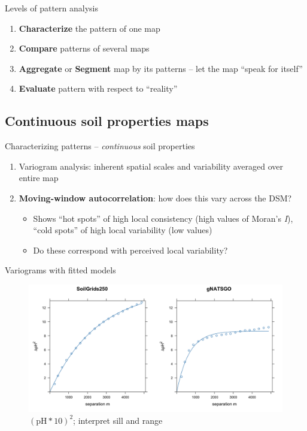 \documentclass[aspectratio=169, 10pt]{beamer}
\begin{document}
\begin{frame}{Levels of pattern analysis}
\begin{enumerate}
    \item \textbf{Characterize} the pattern of one map
    \item \textbf{Compare} patterns of several maps
    \item \textbf{Aggregate} or \textbf{Segment} map by its patterns -- let the map ``speak for itself''
    \item \textbf{Evaluate} pattern with respect to ``reality''
\end{enumerate}
\end{frame}

\subsection{Continuous soil properties maps}

\begin{frame}{Characterizing patterns -- \emph{continuous} soil properties}
    \begin{enumerate}
        \item \textnormal{Variogram analysis}: inherent spatial scales and variability averaged over entire map
        \item \textbf{Moving-window autocorrelation}: how does this vary across the DSM?
          \begin{itemize}
          \item Shows ``hot spots'' of high local consistency (high  values of Moran's \textit{I}), ``cold spots'' of high local  variability (low values)
          \item Do these correspond with perceived local variability?
          \end{itemize}
    \end{enumerate}
\end{frame}

\begin{frame}{Variograms with fitted models}
    \begin{figure}
        \centering
        \includegraphics[height=0.6\textheight]{./graphics_david/variograms.png}
        \\${(\mathrm{pH} * 10)}^2$; interpret sill and range
    \end{figure}
\end{frame}
\end{document}
